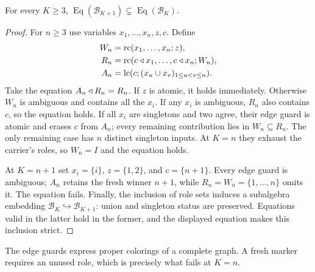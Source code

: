 \begin{proposition}\label{thm:colouring-theories}
For every $K\geq3$,
$\operatorname{Eq}(\mathcal B_{K+1})\subsetneq
 \operatorname{Eq}(\mathcal B_K)$.
\end{proposition}
\begin{proof}
For $n\geq3$ use variables $x_1,\ldots,x_n,z,c$. Define
\begin{align*}
 W_n&=\operatorname{rc}(x_1,\ldots,x_n;z),\\
 R_n&=\operatorname{rc}(c\mathbin{\triangleleft} x_1,\ldots,c\mathbin{\triangleleft} x_n;W_n),\\
 A_n&=\operatorname{lc}(c;(x_u\cup x_v)_{1\leq u<v\leq n}).
\end{align*}
Take the equation $A_n\mathbin{\triangleleft} R_n=R_n$.
If $z$ is atomic, it holds immediately. Otherwise $W_n$ is ambiguous
and contains all the $x_i$. If any $x_i$ is ambiguous, $R_n$ also
contains $c$, so the equation holds. If all $x_i$ are singletons and
two agree, their edge guard is atomic and erases $c$ from $A_n$;
every remaining contribution lies in $W_n\subseteq R_n$.
The only remaining case has $n$ distinct singleton inputs. At $K=n$
they exhaust the carrier's roles, so $W_n=I$ and the equation holds.

At $K=n+1$ set $x_i=\{i\}$, $z=\{1,2\}$, and $c=\{n+1\}$.
Every edge guard is ambiguous; $A_n$ retains the fresh winner $n+1$,
while $R_n=W_n=\{1,\ldots,n\}$ omits it. The equation fails.
Finally, the inclusion of role sets induces a subalgebra embedding
$\mathcal B_K\hookrightarrow\mathcal B_{K+1}$: union and singleton
status are preserved. Equations valid in the latter hold in the
former, and the displayed equation makes this inclusion strict.
\end{proof}

The edge guards express proper colorings of a complete graph. A fresh marker requires an unused role, which is precisely what fails at $K=n$.

